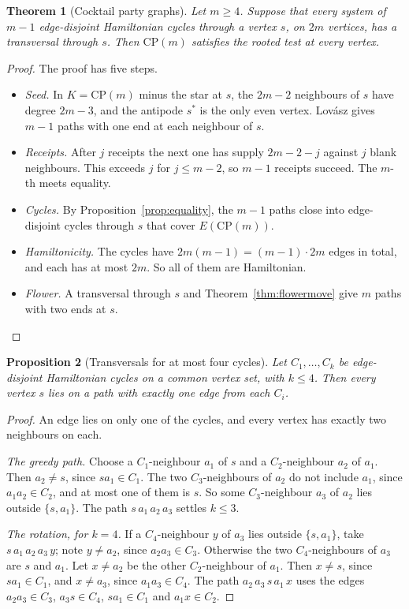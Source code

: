 \documentclass[11pt]{amsart}
\newtheorem{theorem}{Theorem}
\newtheorem{proposition}[theorem]{Proposition}
\theoremstyle{definition}
\begin{document}
\begin{theorem}[Cocktail party graphs]\label{thm:cpm}
Let $m\ge4$. Suppose that every system of $m-1$ edge-disjoint Hamiltonian cycles through a vertex
$s$, on $2m$ vertices, has a transversal through $s$. Then $\mathrm{CP}(m)$ satisfies the rooted
test at every vertex.
\end{theorem}

\begin{proof}
The proof has five steps.
\begin{itemize}
\item \emph{Seed.} In $K=\mathrm{CP}(m)$ minus the star at $s$, the $2m-2$ neighbours of $s$ have
degree $2m-3$, and the antipode $s^*$ is the only even vertex. Lov\'asz gives $m-1$ paths with one
end at each neighbour of $s$.
\item \emph{Receipts.} After $j$ receipts the next one has supply $2m-2-j$ against $j$ blank
neighbours. This exceeds $j$ for $j\le m-2$, so $m-1$ receipts succeed. The $m$-th meets equality.
\item \emph{Cycles.} By Proposition~\ref{prop:equality}, the $m-1$ paths close into edge-disjoint
cycles through $s$ that cover $E(\mathrm{CP}(m))$.
\item \emph{Hamiltonicity.} The cycles have $2m(m-1)=(m-1)\cdot 2m$ edges in total, and each has at
most $2m$. So all of them are Hamiltonian.
\item \emph{Flower.} A transversal through $s$ and Theorem~\ref{thm:flowermove} give $m$ paths with
two ends at $s$.
\end{itemize}
\end{proof}

\begin{proposition}[Transversals for at most four cycles]\label{prop:rt4}
Let $C_1,\dots,C_k$ be edge-disjoint Hamiltonian cycles on a common vertex set, with $k\le4$. Then
every vertex $s$ lies on a path with exactly one edge from each $C_i$.
\end{proposition}

\begin{proof}
An edge lies on only one of the cycles, and every vertex has exactly two neighbours on each.

\emph{The greedy path.} Choose a $C_1$-neighbour $a_1$ of $s$ and a $C_2$-neighbour $a_2$ of $a_1$.
Then $a_2\ne s$, since $sa_1\in C_1$. The two $C_3$-neighbours of $a_2$ do not include $a_1$, since
$a_1a_2\in C_2$, and at most one of them is $s$. So some $C_3$-neighbour $a_3$ of $a_2$ lies outside
$\{s,a_1\}$. The path $s\,a_1\,a_2\,a_3$ settles $k\le3$.

\emph{The rotation, for $k=4$.} If a $C_4$-neighbour $y$ of $a_3$ lies outside $\{s,a_1\}$, take
$s\,a_1\,a_2\,a_3\,y$; note $y\ne a_2$, since $a_2a_3\in C_3$. Otherwise the two $C_4$-neighbours of
$a_3$ are $s$ and $a_1$. Let $x\ne a_2$ be the other $C_2$-neighbour of $a_1$. Then $x\ne s$, since
$sa_1\in C_1$, and $x\ne a_3$, since $a_1a_3\in C_4$. The path $a_2\,a_3\,s\,a_1\,x$ uses the edges
$a_2a_3\in C_3$, $a_3s\in C_4$, $sa_1\in C_1$ and $a_1x\in C_2$.
\end{proof}
\end{document}
